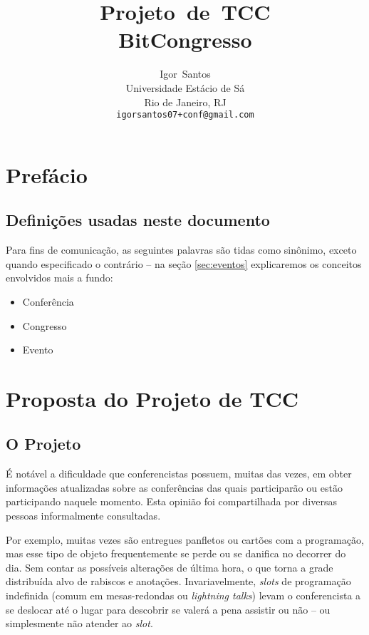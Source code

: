 \documentclass[a4paper]{abntex2}
\author{Igor~Santos\\
	Universidade Est\'acio de S\'a\\
	Rio de Janeiro, RJ\\
	\texttt{igorsantos07+conf@gmail.com}
}
\title{Projeto~de~TCC\\BitCongresso}
\begin{document}
\maketitle


\chapter*{Prefácio}
\section*{Definições usadas neste documento}
Para fins de comunicação, as seguintes palavras são tidas como sinônimo, exceto quando especificado o contrário -- na seção \ref{sec:eventos} explicaremos os conceitos envolvidos mais a fundo:
\begin{itemize}
	\item Conferência
	\item Congresso
	\item Evento
\end{itemize}
\newpage

\tableofcontents

\chapter{Proposta do Projeto de TCC}

\section{O Projeto}

É notável a dificuldade que conferencistas possuem, muitas das vezes, em obter informações atualizadas sobre as conferências das quais participarão ou estão participando naquele momento. Esta opinião foi compartilhada por diversas pessoas informalmente consultadas.

Por exemplo, muitas vezes são entregues panfletos ou cartões com a programação, mas esse tipo de objeto frequentemente se perde ou se danifica no decorrer do dia. Sem contar as possíveis alterações de última hora, o que torna a grade distribuída alvo de rabiscos e anotações. Invariavelmente, \emph{slots} de programação indefinida (comum em mesas-redondas ou \emph{lightning talks}\footnotemark) levam o conferencista a se deslocar até o lugar para descobrir se valerá a pena assistir ou não -- ou simplesmente não atender ao \emph{slot}.
\end{document}
